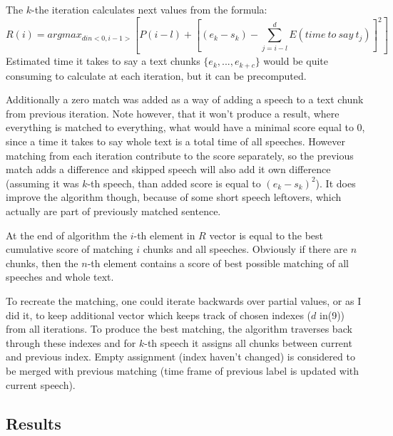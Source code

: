 \documentclass[12pt,a4paper,english]{article}
\begin{document}
The $k$-the iteration calculates next values from the formula:
\begin{equation}
    R(i) = argmax_{d in <0, i - 1>} [P(i-l) + [(e_k - s_k) - \sum_{j = i - l}^d E(time \: to \: say \: t_j)]^2 ]
\end{equation}
Estimated time it takes to say a text chunks $\{e_k, ..., e_{k+c}\}$ would be quite consuming to calculate at each iteration, but it can be precomputed. \newline

Additionally a zero match was added as a way of adding a speech to a text chunk from previous iteration.  Note however, that it won't produce a result, where everything is matched to everything, what would have a minimal score equal to 0, since a time it takes to say whole text is a total time of all speeches. \newline
However matching from each iteration contribute to the score separately, so the previous match adds a difference and skipped speech will also add it own difference (assuming it was $k$-th speech, than added score is equal to $(e_k - s_k)^2$). \newline
It does improve the algorithm though, because of some short speech leftovers, which actually are part of previously matched sentence. \newline

\newpage
At the end of algorithm the $i$-th element in $R$ vector is equal to the best cumulative score of matching $i$ chunks and all speeches. Obviously if there are $n$ chunks, then the $n$-th element contains a score of best possible matching of all speeches and whole text. \newline

To recreate the matching, one could iterate backwards over partial values, or as I did it, to keep additional vector which keeps track of chosen indexes ($d$ in(9)) from all iterations. To produce the best matching, the algorithm traverses back through these indexes and for $k$-th speech it assigns all chunks between current and previous index. Empty assignment (index haven't changed) is considered to be merged with previous matching (time frame of previous label is updated with current speech). \newline
\newline

\subsection{Results}
\end{document}
